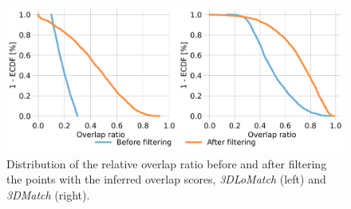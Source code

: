 \begin{figure}[t]
    \centering
    \includegraphics[width=\columnwidth]{figures/images/improve_overlap.png}

    \caption{Distribution of the relative overlap ratio before and after filtering the points with the inferred overlap scores, \textit{3DLoMatch} (left) and \textit{3DMatch} (right).}
    \label{fig:imp_overlap}
    
\end{figure}